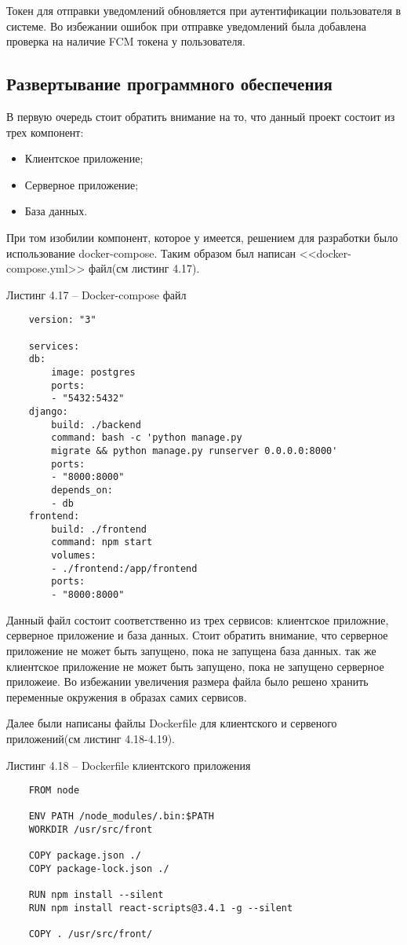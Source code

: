 Токен для отправки уведомлений обновляется при аутентификации пользователя в системе.
Во избежании ошибок при отправке уведомлений была добавлена проверка на наличие FCM токена у пользователя.

\subsection{Развертывание программного обеспечения}
В первую очередь стоит обратить внимание на то, что данный проект состоит из трех компонент:
\begin{itemize}
    \item Клиентское приложение;
    \item Серверное приложение;
    \item База данных.
\end{itemize}

При том изобилии компонент, которое у имеется, решением для разработки было использование docker-compose.
Таким образом был написан <<docker-compose.yml>> файл(см листинг 4.17).

Листинг 4.17 – Docker-compose файл
\begin{lstlisting}
    version: "3"

    services:
    db:
        image: postgres
        ports:
        - "5432:5432"
    django:
        build: ./backend
        command: bash -c 'python manage.py
        migrate && python manage.py runserver 0.0.0.0:8000'
        ports:
        - "8000:8000"
        depends_on:
        - db
    frontend:
        build: ./frontend
        command: npm start
        volumes:
        - ./frontend:/app/frontend
        ports:
        - "8000:8000"
\end{lstlisting}


Данный файл состоит соответственно из трех сервисов: клиентское приложние, серверное приложение и база данных.
Стоит обратить внимание, что серверное приложение не может быть запущено, пока не запущена база данных.
так же клиентское приложение не может быть запущено, пока не запущено серверное приложеие.
Во избежании увеличения размера файла было решено хранить переменные окружения в образах самих сервисов.

Далее были написаны файлы Dockerfile для клиентского и сервеного приложений(см листинг 4.18-4.19).


Листинг 4.18 – Dockerfile клиентского приложения
\begin{lstlisting}
    FROM node

    ENV PATH /node_modules/.bin:$PATH
    WORKDIR /usr/src/front

    COPY package.json ./
    COPY package-lock.json ./

    RUN npm install --silent
    RUN npm install react-scripts@3.4.1 -g --silent

    COPY . /usr/src/front/
\end{lstlisting}

